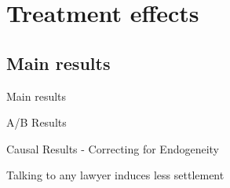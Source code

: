 \documentclass[8pt]{beamer}
\begin{document}


\section{Treatment effects}

\subsection{Main results}
\begin{frame}{Main results}

 \begin{table}[H] 
 \begin{subtable}{1.\textwidth}
 \begin{center}
 \tiny{}
 \end{center}
 \end{subtable}
 \end{table}  
 
\end{frame}


\begin{frame}{A/B Results}

 \begin{table}[H] 
 \begin{subtable}{1.\textwidth}
 \begin{center}
 \tiny{}
 \end{center}
 \end{subtable}
 \end{table}  
 
\end{frame}


\begin{frame}{Causal Results - Correcting for Endogeneity}

 \begin{table}[H] 
 \begin{subtable}{1.\textwidth}
 \begin{center}
 \tiny{}
 \end{center}
 \end{subtable}
 \end{table}  
 
\end{frame}

\begin{frame}{Talking to any lawyer induces less settlement}

 \begin{table}[H] 
 \begin{subtable}{1.\textwidth}
 \begin{center}
 \tiny{}
 \end{center}
 \end{subtable}
 \end{table}  
 
\end{frame}
\end{document}
